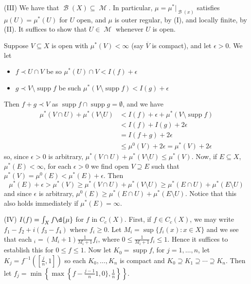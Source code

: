 \documentclass[11pt, a4paper]{memoir}
\theoremstyle{change}
\theoremstyle{plain}
\theoremstyle{nonumberplain}
\DeclareMathOperator{\M}{{\mathcal{M}}}
\DeclareMathOperator{\B}{{\mathcal{B}}}
\DeclareMathOperator{\supp}{supp}
\begin{document}
(III) We have that $\B(X)\subseteq\M$.
In particular, $\mu=\mu^*|_{\B(x)}$ satisfies $\mu(U)=\mu^*(U)$ for $U$ open, and $\mu$ is outer regular, by (I), and locally finite, by (II).
It suffices to show that $U\in\M$ whenever $U$ is open.

Suppose $V\subseteq X$ is open with $\mu^*(V)<\infty$ (say $\overline{V}$ is compact), and let $\epsilon>0$.
We let
\begin{itemize}[nl]
    \item $f\prec U\cap V$ be so $\mu^*(U)\cap V<I(f)+\epsilon$
    \item $g\prec V\setminus\supp f$ be such $\mu^*(V\setminus\supp f)< I(g)+\epsilon$
\end{itemize}
Then $f+g\prec V$ as $\supp f\cap\supp g=\emptyset$, and we have
\begin{align*}
    \mu^*(V\cap U)+\mu^*(V\setminus U) &< I(f)+\epsilon+\mu^*(V\setminus\supp f)\\
                                       &< I(f)+I(g)+2\epsilon\\
                                       &= I(f+g)+2\epsilon\\
                                       &\leq \mu^0(V)+2\epsilon=\mu^*(V)+2\epsilon
\end{align*}
so, since $\epsilon>0$ is arbitrary, $\mu^*(V\cap U)+\mu^*(V\setminus U)\leq\mu^*(V)$.
Now, if $E\subseteq X$, $\mu^*(E)<\infty$, for each $\epsilon>0$ we find open $V\supseteq E$ such that $\mu^*(V)=\mu^0(E)<\mu^*(E)+\epsilon$.
Then
\begin{equation*}
    \mu^*(E)+\epsilon > \mu^*(V) \geq \mu^*(V\cap U)+\mu^*(V\setminus U)\geq\mu^*(E\cap U)+\mu^*(E\setminus U)
\end{equation*}
and since $\epsilon$ is arbitrary, $\mu^0(E)\geq\mu^*(E\cap U)+\mu^*(E\setminus U)$.
Notice that this also holds immediately if $\mu^*(E)=\infty$.

(IV) $I(f)=\int_X f\d{\mu}$ for $f$ in $C_c(X)$.
First, if $f\in C_c(X)$, we may write $f_1-f_2+i(f_3-f_4)$ where $f_i\geq 0$.
Let $M_i=\sup\{f_i(x):x\in X\}$ and we see that each $_i=(M_i+1)\frac{1}{M_i+1}f_i$, where $0\leq\frac{1}{M_i+1}f_i\leq 1$.
Hence it suffices to establish this for $0\leq f\leq 1$.
Now let $K_0=\supp f$, for $j=1,\ldots,n$, let $K_j=f^{-1}\left(\left[\frac{j}{n},1\right]\right)$ so each $K_0,\ldots,K_n$ is compact and $K_0\supseteq K_1\supseteq\cdots\supseteq K_n$.
Then let $f_j=\min\left\{\max\left\{f-\frac{j-1}{n}1,0\},\frac{1}{n}\right\}\right\}$.
\end{document}

